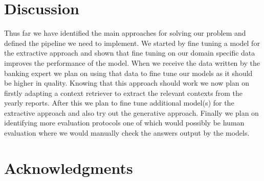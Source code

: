 \documentclass[fleqn,moreauthors,10pt]{ds_report}
\begin{document}




\section*{Discussion}
Thus far we have identified the main approaches for solving our problem and defined the pipeline we need to implement.
We started by fine tuning a model for the extractive approach and shown that fine tuning on our domain specific data improves the performance of the model.
When we receive the data written by the banking expert we plan on using that data to fine tune our models as it should be higher in quality.
Knowing that this approach should work we now plan on firstly adapting a context retriever to extract the relevant contexts from the yearly reports.
After this we plan to fine tune additional model(s) for the extractive approach and also try out the generative approach.
Finally we plan on identifying more evaluation protocols one of which would possibly be human evaluation where we would manually check the answers output by the models.




\section*{Acknowledgments}





\end{document}
